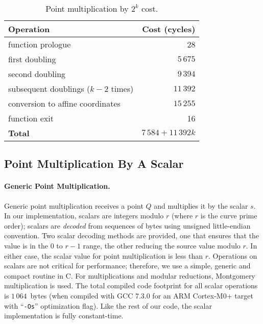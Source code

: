 \documentclass{llncs}
\begin{document}
\begin{table}[H]
\begin{center}
    \begin{tabular}{|l|r|}
    \hline
    \textsf{\textbf{Operation}} & \textsf{\textbf{Cost (cycles)}} \\
    \hline
    function prologue                                  &        28 \\
    first doubling                                     &  $5\,675$ \\
    second doubling                                    &  $9\,394$ \\
    subsequent doublings ($k-2$ times)                 & $11\,392$ \\
    conversion to affine coordinates                   & $15\,255$ \\
    function exit                                      &        16 \\
    \hline
    \textsf{\textbf{Total}}                            & $7\,584 + 11\,392k$ \\
    \hline
    \end{tabular}
\end{center}
\caption{\label{tab:pointmul2k}Point multiplication by $2^k$ cost.}
\end{table}

\subsection{Point Multiplication By A Scalar}

\paragraph{Generic Point Multiplication.}

Generic point multiplication receives a point $Q$ and multiplies it by
the scalar $s$. In our implementation, scalars are integers modulo $r$
(where $r$ is the curve prime order); scalars are \emph{decoded} from
sequences of bytes using unsigned little-endian convention. Two scalar
decoding methods are provided, one that ensures that the value is in the
$0$ to $r-1$ range, the other reducing the source value modulo $r$. In
either case, the scalar value for point multiplication is less than $r$.
Operations on scalars are not critical for performance; therefore, we
use a simple, generic and compact routine in C. For multiplications and
modular reductions, Montgomery multiplication is used. The total
compiled code footprint for all scalar operations is $1\,064$~bytes
(when compiled with GCC 7.3.0 for an ARM Cortex-M0+ target with
``\verb+-Os+'' optimization flag). Like the rest of our code, the scalar
implementation is fully constant-time.
\end{document}
